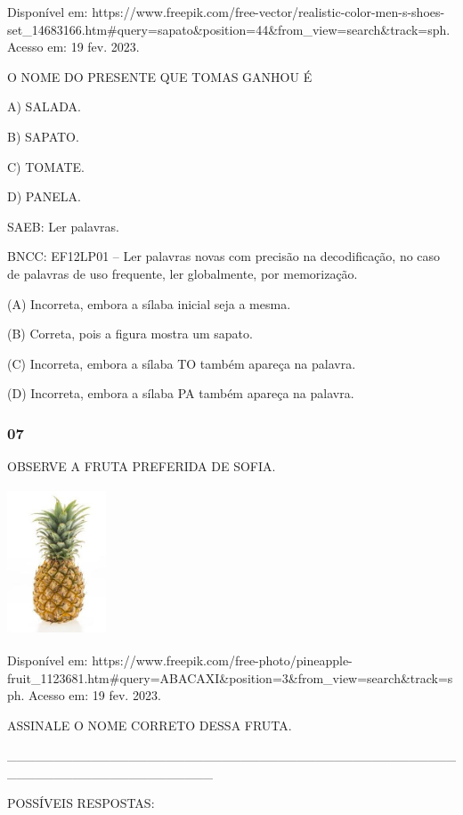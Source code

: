 Disponível
em: https://www.freepik.com/free-vector/realistic-color-men-s-shoes-set\_14683166.htm\#query=sapato\&position=44\&from\_view=search\&track=sph. Acesso em: 19 fev. 2023.

O NOME DO PRESENTE QUE TOMAS GANHOU É

A) SALADA.

B) SAPATO.

C) TOMATE.

D) PANELA.

SAEB: Ler palavras.

BNCC: EF12LP01 -- Ler palavras novas com precisão na
decodificação, no caso de palavras de uso frequente, ler globalmente,
por memorização.

(A) Incorreta, embora a sílaba inicial seja a mesma.

(B) Correta, pois a figura mostra um sapato.

\protect\hypertarget{_heading=h.vx1227}{}{}
(C) Incorreta, embora a sílaba TO também apareça na palavra.

(D) Incorreta, embora a sílaba PA também apareça na palavra.\protect\hypertarget{_heading=h.bdexdhbfzr3s}{}{}

\subsubsection{07}\label{section-32}

OBSERVE A FRUTA PREFERIDA DE SOFIA.

\includegraphics[width=1.15208in,height=1.72708in]{media/image192.jpg}

Disponível
em: https://www.freepik.com/free-photo/pineapple-fruit\_1123681.htm\#query=ABACAXI\&position=3\&from\_view=search\&track=sph. Acesso em: 19 fev. 2023.

ASSINALE O NOME CORRETO DESSA FRUTA.

\_\_\_\_\_\_\_\_\_\_\_\_\_\_\_\_\_\_\_\_\_\_\_\_\_\_\_\_\_\_\_\_\_\_\_\_\_\_\_\_\_\_\_\_\_\_\_\_\_\_\_\_\_\_\_\_\_\_\_\_\_\_\_\_\_\_\_\_\_\_

\protect\hypertarget{_heading=h.3fwokq0}{}{}POSSÍVEIS RESPOSTAS:


